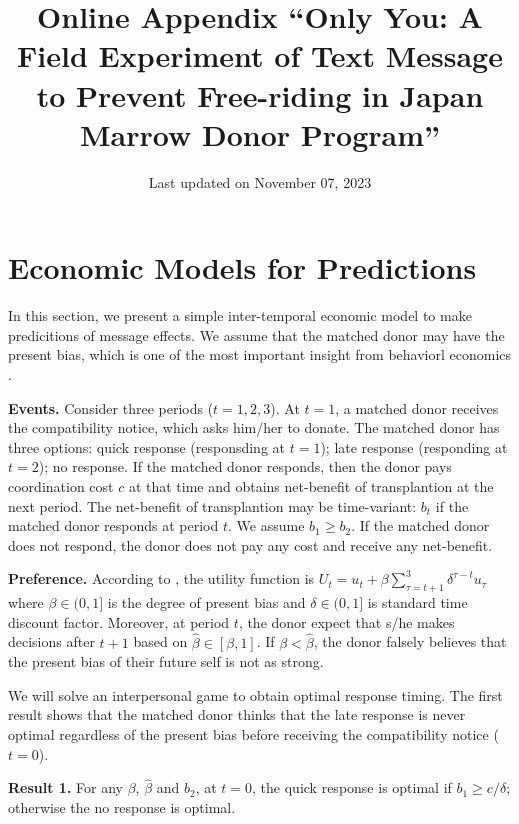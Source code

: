 \documentclass[
]{article}
\title{Online Appendix
``Only You: A Field Experiment of Text Message to Prevent Free-riding in Japan Marrow Donor Program''}
\author{}
\date{\vspace{-2.5em}Last updated on November 07, 2023}
\begin{document}
\maketitle

{
\setcounter{tocdepth}{2}
\tableofcontents
}
\hypertarget{economic-models-for-predictions}{%
\section{Economic Models for Predictions}\label{economic-models-for-predictions}}

In this section, we present a simple inter-temporal economic model to make predicitions of message effects. We assume that the matched donor may have the present bias, which is one of the most important insight from behaviorl economics \citep{Laibson1997, ODonoghue2001}.

\noindent
\textbf{Events.} Consider three periods (\(t = 1, 2, 3\)). At \(t=1\), a matched donor receives the compatibility notice, which asks him/her to donate. The matched donor has three options: quick response (responsding at \(t=1\)); late response (responding at \(t=2\)); no response. If the matched donor responds, then the donor pays coordination cost \(c\) at that time and obtains net-benefit of transplantion at the next period. The net-benefit of transplantion may be time-variant: \(b_t\) if the matched donor responds at period \(t\). We assume \(b_1 \ge b_2\). If the matched donor does not respond, the donor does not pay any cost and receive any net-benefit.

\noindent
\textbf{Preference.} According to \citet{Laibson1997}, the utility function is \(U_t = u_t + \beta \sum_{\tau = t + 1}^{3} \delta^{\tau - t} u_{\tau}\) where \(\beta \in (0, 1]\) is the degree of present bias and \(\delta \in (0, 1]\) is standard time discount factor. Moreover, at period \(t\), the donor expect that s/he makes decisions after \(t + 1\) based on \(\hat{\beta} \in [\beta, 1]\). If \(\beta < \hat{\beta}\), the donor falsely believes that the present bias of their future self is not as strong.

We will solve an interpersonal game \citep{ODonoghue2001} to obtain optimal response timing. The first result shows that the matched donor thinks that the late response is never optimal regardless of the present bias before receiving the compatibility notice (\(t=0\)).

\noindent
\textbf{Result 1.} For any \(\beta\), \(\hat{\beta}\) and \(b_2\), at \(t = 0\), the quick response is optimal if \(b_1 \ge c/\delta\); otherwise the no response is optimal.
\end{document}
